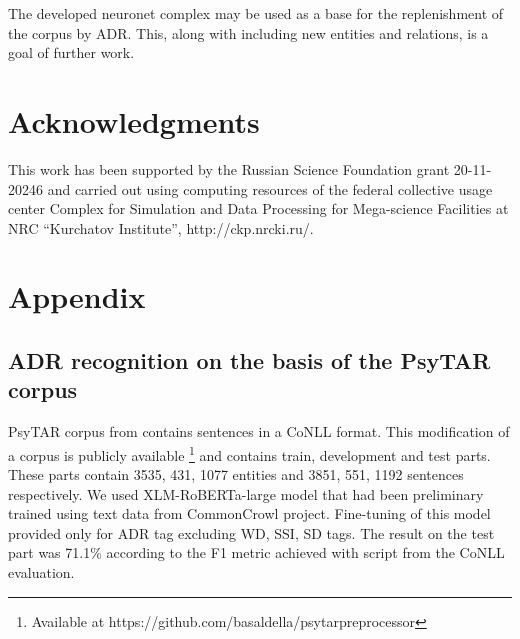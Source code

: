 \documentclass[a4paper,fleqn,longmktitle]{cas-dc}
\begin{document}
 
 The developed neuronet complex may be used as a base for the replenishment of the corpus by ADR. This, along with including new entities and relations, is a goal of further work.


\section*{Acknowledgments}
This work has been supported by the Russian Science Foundation grant 20-11-20246 and carried out using computing resources of the federal collective usage center Complex for Simulation and Data Processing for Mega-science Facilities at NRC “Kurchatov Institute”, http://ckp.nrcki.ru/.



%





\appendix%
\section{Appendix}
\subsection*{ADR recognition on the basis of the PsyTAR corpus} \label{subsec:psytar_adr}
PsyTAR corpus from  \cite{basaldella2019bioreddit} contains sentences in a CoNLL format.
This modification of a corpus is publicly available \footnote{Available at https://github.com/basaldella/psytarpreprocessor} and contains train, development and test parts. These parts contain 3535, 431, 1077 entities and 3851, 551, 1192 sentences respectively. We used XLM-RoBERTa-large model  that had been preliminary trained using text data from CommonCrowl project. Fine-tuning of this model provided only for ADR tag excluding WD, SSI, SD tags. The result on the test part was 71.1\% according to the F1 metric achieved with script from the CoNLL evaluation. 


\end{document}
